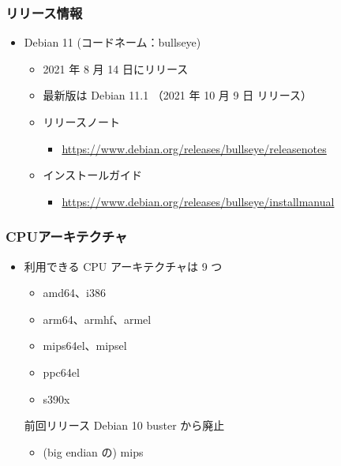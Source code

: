 \documentclass[mingoth,a4paper]{jsarticle}
\begin{document}
\subsubsection{リリース情報}


\begin{itemize}
\item Debian 11 (コードネーム：bullseye)
  \begin{itemize}
  \item 2021 年 8 月 14 日にリリース
  \item 最新版は Debian 11.1 （2021 年 10 月 9 日 リリース）
  \item リリースノート
    \begin{itemize}
    \item \url{https://www.debian.org/releases/bullseye/releasenotes}
    \end{itemize}
  \item インストールガイド
    \begin{itemize}
    \item \url{https://www.debian.org/releases/bullseye/installmanual}
    \end{itemize}  
  \end{itemize}


\end{itemize}


\subsubsection{CPUアーキテクチャ}

\begin{itemize}
\item 利用できる CPU アーキテクチャは 9 つ
  
  \begin{itemize}
  \item amd64、i386
  \item arm64、armhf、armel
  \item mips64el、mipsel
  \item ppc64el
  \item s390x
  \end{itemize}
  
  前回リリース Debian 10 buster から廃止
  \begin{itemize}
  \item (big endian の) mips
  \end{itemize}
\end{itemize}
\end{document}
